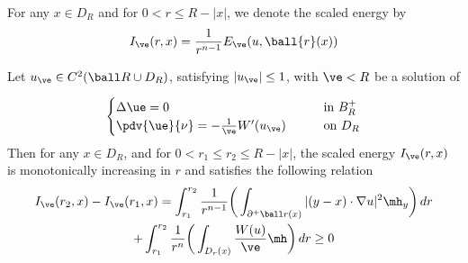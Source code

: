 For any $x \in D_R$ and for $0<r\leq R-|x|$, we denote the scaled energy by 
 $$
    I_{\ve}(r,x) =  \frac{1}{r^{n-1}}E_{\ve}(u, \ball {r}(x))
 $$
\begin{theo}
Let $u_\ve \in C^2(\ball R \cup D_R)$, satisfying $|u_\ve|\leq 1$, with $\ve <R$ be a solution of 

    \begin{equation} \label{eqn:main}
        \begin{cases}
            \Delta \ue = 0 \qquad &\text{in } B_R^+ \\
            \pdv{\ue}{\nu} = -\frac{1}{\ve}W'(u_\ve) \qquad  &\text{on  } D_R
        \end{cases}
    \end{equation}
Then for any $x \in D_R$, and for $0< r_1 \leq r_2 \leq R-|x|$, the scaled energy $I_\ve(r,x)$ is monotonically increasing in $r$ and satisfies the following relation
\begin{multline} \label{eqn:mf1}
   I_{\ve}(r_2,x) - I_{\ve}(r_1,x)
    = \int_{r_1}^{r_2} \frac{1}{r^{n-1}}\bigg(\int_{\partial ^+\ball r(x)} |(y-x)\cdot \nabla u|^2 \mh_y \bigg) \,dr \\
    + \int_{r_1}^{r_2} \frac{1}{r^{n}} \bigg( \int_{D_r(x)} \frac{W(u)}{\ve} \mh \bigg) \,dr
    \geq 0
\end{multline}
\end{theo}
